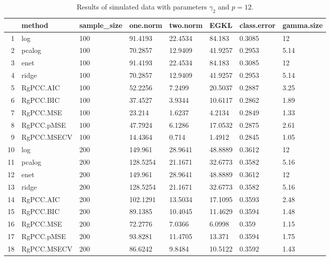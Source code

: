 \begin{table}[ht]
\centering
\begin{tabular}{rlllllll}
  \hline
 & method & sample\_size & one.norm & two.norm & EGKL & class.error & gamma.size \\ 
  \hline
1 & log & 100 & 91.4193 & 22.4534 & 84.183 & 0.3085 & 12 \\ 
  2 & pcalog & 100 & 70.2857 & 12.9409 & 41.9257 & 0.2953 & 5.14 \\ 
  3 & enet & 100 & 91.4193 & 22.4534 & 84.183 & 0.3085 & 12 \\ 
  4 & ridge & 100 & 70.2857 & 12.9409 & 41.9257 & 0.2953 & 5.14 \\ 
  5 & RgPCC.AIC & 100 & 52.2256 & 7.2499 & 20.5037 & 0.2887 & 3.25 \\ 
  6 & RgPCC.BIC & 100 & 37.4527 & 3.9344 & 10.6117 & 0.2862 & 1.89 \\ 
  7 & RgPCC.MSE & 100 & 23.214 & 1.6237 & 4.2134 & 0.2849 & 1.33 \\ 
  8 & RgPCC.pMSE & 100 & 47.7924 & 6.1286 & 17.0532 & 0.2875 & 2.61 \\ 
  9 & RgPCC.MSECV & 100 & 14.4364 & 0.714 & 1.4912 & 0.2845 & 1.05 \\ 
  10 & log & 200 & 149.961 & 28.9641 & 48.8889 & 0.3612 & 12 \\ 
  11 & pcalog & 200 & 128.5254 & 21.1671 & 32.6773 & 0.3582 & 5.16 \\ 
  12 & enet & 200 & 149.961 & 28.9641 & 48.8889 & 0.3612 & 12 \\ 
  13 & ridge & 200 & 128.5254 & 21.1671 & 32.6773 & 0.3582 & 5.16 \\ 
  14 & RgPCC.AIC & 200 & 102.1291 & 13.5034 & 17.1095 & 0.3593 & 2.48 \\ 
  15 & RgPCC.BIC & 200 & 89.1385 & 10.4045 & 11.4629 & 0.3594 & 1.48 \\ 
  16 & RgPCC.MSE & 200 & 72.2776 & 7.0366 & 6.0998 & 0.359 & 1.15 \\ 
  17 & RgPCC.pMSE & 200 & 93.8281 & 11.4705 & 13.371 & 0.3594 & 1.75 \\ 
  18 & RgPCC.MSECV & 200 & 86.6242 & 9.8484 & 10.5122 & 0.3592 & 1.43 \\ 
   \hline
\end{tabular}
\caption{Results of simulated data with parameters $\gamma_2$ and $p =12$. } 
\label{fig-2-lead-12-metrics-p}
\end{table}
